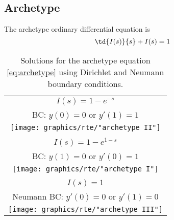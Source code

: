 \subsection{\label{subsec:Archetype}Archetype}

The archetype ordinary differential equation is
\begin{equation}
  \td{I(s)}{s} + I(s) = 1
  \label{eq:archetype}
\end{equation}

\begin{table}[htbp]
\caption[Solutions for the archetype equation]{Solutions for the archetype equation \eqref{eq:archetype} using Dirichlet and Neumann boundary conditions.}
\begin{center}
\begin{tabular}{c}
%
 $I(s) = 1 - e^{-s}$ \\
%
 BC: $y(0) = 0$ or $y'(1) = 1$ \\
%
\texttt{[image: graphics/rte/"archetype II"]} \\\hline
%
 \\
%
 $I(s) = 1 - e^{1-s}$ \\
%
 BC: $y(1) = 0$ or $y'(0) = 1$ \\
%
\texttt{[image: graphics/rte/"archetype I"]} \\\hline
%
 \\
%
 $I(s) = 1$ \\
%
 Neumann BC: $y'(0) = 0$ or $y'(1) = 0$ \\
%
\texttt{[image: graphics/rte/"archetype III"]}
%
\end{tabular}
\end{center}
\label{tab:ode:archetype}
\end{table}%

\endinput %